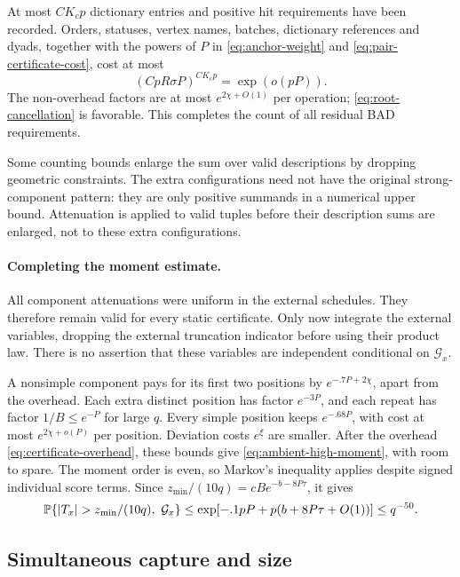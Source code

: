 At most \(CK_cp\) dictionary entries and positive hit requirements have
been recorded.  Orders, statuses, vertex names, batches, dictionary
references and dyads, together with the powers of \(P\) in
\eqref{eq:anchor-weight} and \eqref{eq:pair-certificate-cost}, cost at most
\begin{equation}
 (CpR\sigma P)^{CK_cp}=\exp(o(pP)).
 \label{eq:certificate-overhead}
\end{equation}
The non-overhead factors are at most \(e^{2\chi+O(1)}\) per operation;
\eqref{eq:root-cancellation} is favorable.  This completes the count of
all residual BAD requirements.

Some counting bounds enlarge the sum over valid descriptions by dropping
geometric constraints.  The extra configurations need not have the
original strong-component pattern: they are only positive summands in a
numerical upper bound.  Attenuation is applied to valid tuples before
their description sums are enlarged, not to these extra configurations.

\paragraph{Completing the moment estimate.}
All component attenuations were uniform in the external schedules.
They therefore remain valid for every static certificate.  Only now
integrate the external variables, dropping the external truncation
indicator before using their product law.  There is no assertion that
these variables are independent conditional on \(\mathcal G_x\).

A nonsimple component pays for its first two positions by
\(e^{-.7P+2\chi}\), apart from the overhead.  Each extra distinct position
has factor \(e^{-3P}\), and each repeat has factor \(1/B\le e^{-P}\) for
large \(q\).  Every simple position keeps \(e^{-.68P}\), with cost at most
\(e^{2\chi+o(P)}\) per position.  Deviation costs \(e^\xi\) are smaller.
After the overhead \eqref{eq:certificate-overhead}, these bounds give
\eqref{eq:ambient-high-moment}, with room to spare.  The moment order is
even, so Markov's inequality applies despite signed individual score
terms.  Since \(z_{\min}/(10q)=cB e^{-b-8P\tau}\), it gives
\begin{equation}
 \PP\{|T_x|>z_{\min}/(10q),\ \mathcal G_x\}
 \le \exp[-.1pP+p(b+8P\tau+O(1))]\le q^{-50}.
 \label{eq:ambient-score-tail}
\end{equation}

\subsection{Simultaneous capture and size}
\label{subsec:score-assembly}


